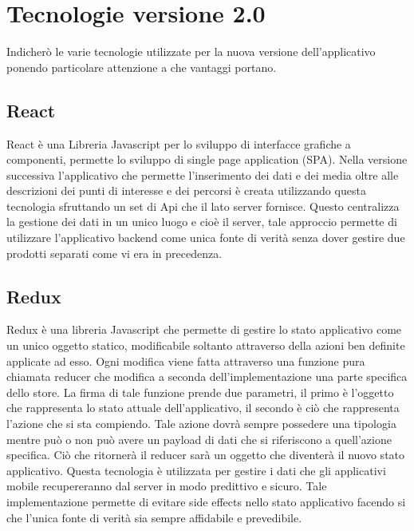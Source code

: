 \section{Tecnologie versione 2.0}\vspace{5mm}
Indicherò le varie tecnologie utilizzate per la nuova versione dell'applicativo ponendo particolare attenzione a che vantaggi portano.\vspace{5mm}

	\subsection{React}\vspace{5mm}

React\cite{React} è una Libreria Javascript per lo sviluppo di interfacce grafiche a componenti, permette lo sviluppo di single page application (SPA). Nella versione successiva l’applicativo che permette l’inserimento dei dati e dei media oltre alle descrizioni dei punti di interesse e dei percorsi è creata utilizzando questa tecnologia sfruttando un set di Api che il lato server fornisce. Questo centralizza la gestione dei dati in un unico luogo e cioè il server, tale approccio permette di utilizzare l'applicativo backend come unica fonte di verità senza dover gestire due prodotti separati come vi era in precedenza.\vspace{5mm}

	\subsection{Redux}\vspace{5mm}
	
	Redux è una libreria Javascript che permette di gestire lo stato applicativo come un unico oggetto statico, modificabile soltanto attraverso della azioni ben definite applicate ad esso. Ogni modifica viene fatta attraverso una funzione pura\cite{PureFunction} chiamata reducer che modifica a seconda dell'implementazione una parte specifica dello store. La firma di tale funzione prende due parametri, il primo è l'oggetto che rappresenta lo stato attuale dell'applicativo, il secondo è ciò che rappresenta l'azione che si sta compiendo. Tale azione dovrà sempre possedere una tipologia mentre può o non può avere un payload di dati che si riferiscono a quell'azione specifica. Ciò che ritornerà il reducer sarà un oggetto che diventerà il nuovo stato applicativo. Questa tecnologia è utilizzata per gestire i dati che gli applicativi mobile recupereranno dal server in modo predittivo e sicuro. Tale implementazione permette di evitare side effects\cite{SideEffects} nello stato applicativo facendo si che l'unica fonte di verità sia sempre affidabile e prevedibile. \vspace{5mm}
	
